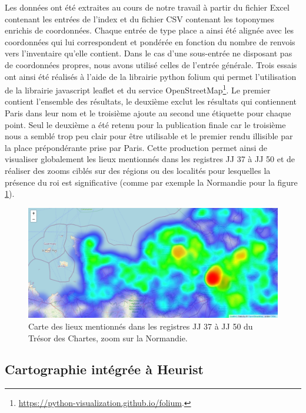 \documentclass[a4paper,12pt,twoside]{book}
\begin{document}
	Les données ont été extraites au cours de notre travail à partir du fichier Excel contenant les entrées de l'index et du fichier CSV contenant les toponymes enrichis de coordonnées. Chaque entrée de type \og place\fg{} a ainsi été alignée avec les coordonnées qui lui correspondent et pondérée en fonction du nombre de renvois vers l'inventaire qu'elle contient. Dans le cas d'une sous-entrée ne disposant pas de coordonnées propres, nous avons utilisé celles de l'entrée générale. Trois essais ont ainsi été réalisés à l'aide de la librairie python folium qui permet l'utilisation de la librairie javascript leaflet et du service OpenStreetMap\footnote{\url{https://python-visualization.github.io/folium}.}. Le premier contient l'ensemble des résultats, le deuxième exclut les résultats qui contiennent \og Paris\fg{} dans leur nom et le troisième ajoute au second une étiquette pour chaque point. Seul le deuxième a été retenu pour la publication finale car le troisième nous a semblé trop peu clair pour être utilisable et le premier rendu illisible par la place prépondérante prise par Paris. Cette production permet ainsi de visualiser globalement les lieux mentionnés dans les registres JJ 37 à JJ 50 et de réaliser des zooms ciblés sur des régions ou des localités pour lesquelles la présence du roi est significative (comme par exemple la Normandie pour la figure \ref{Carte_zoom_Normandie}).
	
	\begin{figure}
		\centering
		\includegraphics[width=\textwidth]{Images/Carte_zoom_Normandie.png}
		\caption{Carte des lieux mentionnés dans les registres JJ 37 à JJ 50 du Trésor des Chartes, zoom sur la Normandie.}
		\label{Carte_zoom_Normandie}
	\end{figure}
	
	\subsection{Cartographie intégrée à Heurist}
	
\end{document}
